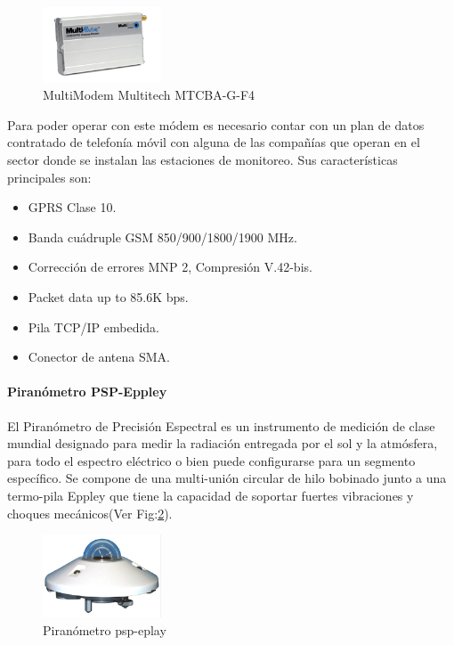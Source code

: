 \begin{figure}[h!]
        \centering
        \includegraphics[width=100pt]{images/MultiModemGPRS}
        \caption{MultiModem Multitech MTCBA-G-F4}
	\label{modem} 
\end{figure}

Para poder operar con este módem es necesario contar con un plan de datos contratado de telefonía móvil con alguna de las compañías que operan en el sector donde se instalan las estaciones de monitoreo. Sus características principales son:\\

\begin{itemize}
\item GPRS Clase 10.
\item Banda cuádruple GSM 850/900/1800/1900 MHz.
\item Corrección de errores MNP 2, Compresión V.42-bis.
\item Packet data up to 85.6K bps.
\item Pila TCP/IP embedida.
\item Conector de antena SMA.
\end{itemize}

\paragraph{Piranómetro PSP-Eppley}
El Piranómetro de Precisión Espectral es un instrumento de medición de clase mundial designado para medir la radiación entregada por el sol y la atmósfera, para todo el espectro eléctrico o bien puede configurarse para un segmento específico. Se compone de una multi-unión circular de hilo bobinado junto a una termo-pila Eppley que tiene la capacidad de soportar fuertes vibraciones y choques mecánicos(Ver Fig:\ref{piranometro}).

\begin{figure}[h!]
        \centering
        \includegraphics[width=100pt]{images/piranometro}
        \caption{Piranómetro psp-eplay}
	\label{piranometro}
\end{figure}

